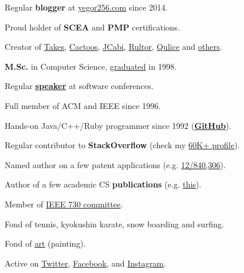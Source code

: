 \documentclass[12pt]{article}
\begin{document}
Regular \textbf{blogger} at \href{http://www.yegor256.com/}{yegor256.com} since 2014.

Proud holder of \textbf{SCEA} and
  \textbf{PMP} certifications.

Creator of \href{http://www.takes.org}{Takes},
  \href{http://www.cactoos.org}{Cactoos},
  \href{http://www.jcabi.com}{JCabi},
  \href{http://www.rultor.com}{Rultor},
  \href{http://www.qulice.com}{Qulice} and
  \href{http://www.yegor256.com/pets.html}{others}.

\textbf{M.Sc.} in Computer Science,
  \href{https://en.wikipedia.org/wiki/Oles_Honchar_Dnipro_National_University}{graduated} in 1998.

Regular \textbf{\href{http://www.yegor256.com/talks.html}{speaker}} at software conferences.

Full member of ACM and IEEE since 1996.

Hands-on Java/C++/Ruby programmer since 1992
  (\textbf{\href{https://github.com/yegor256}{GitHub}}).

Regular contributor to \textbf{StackOverflow}
  (check my \href{https://stackexchange.com/users/63162/yegor256}{60K+ profile}).

Named author on a few patent applications
  (e.g. \href{https://www.google.com/patents/US20120023476}{12/840,306}).

Author of a few academic CS \textbf{publications}
  (e.g. \href{link.springer.com/chapter/10.1007/978-3-642-02152-7_6}{this}).

Member of \href{http://standards.ieee.org/develop/wg/730.html}{IEEE 730 committee}.

Fond of tennis, kyokushin karate, snow boarding and surfing.

Fond of \href{http://www.yegor256.com/paintings.html}{art} (painting).

Active on
  \href{https://twitter.com/intent/follow?screen_name=yegor256}{Twitter},
  \href{https://www.facebook.com/yegor256}{Facebook},
  and \href{https://instagram.com/yegor256}{Instagram}.
\end{document}
